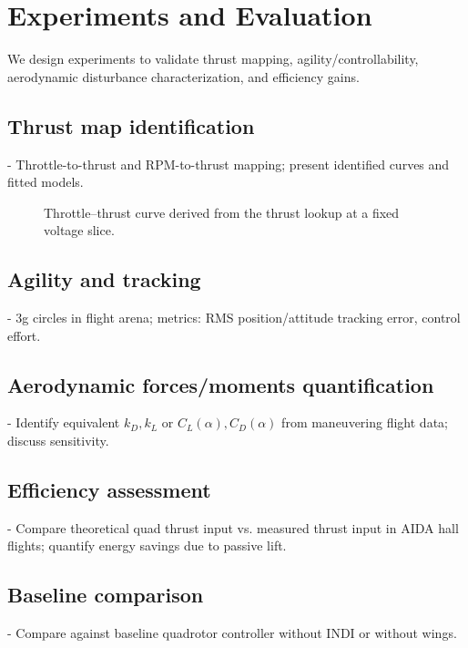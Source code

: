 
\chapter{Experiments and Evaluation}\label{chapter:experiments-evaluation}

We design experiments to validate thrust mapping, agility/controllability, aerodynamic disturbance characterization, and efficiency gains.

\section{Thrust map identification}
- Throttle-to-thrust and RPM-to-thrust mapping; present identified curves and fitted models.

\begin{figure}[htbp]
  \centering
  \caption{Throttle–thrust curve derived from the thrust lookup at a fixed voltage slice.}
\end{figure}

\section{Agility and tracking}
- 3g circles in flight arena; metrics: RMS position/attitude tracking error, control effort.

\section{Aerodynamic forces/moments quantification}
- Identify equivalent $k_D,k_L$ or $C_L(\alpha), C_D(\alpha)$ from maneuvering flight data; discuss sensitivity.

\section{Efficiency assessment}
- Compare theoretical quad thrust input vs. measured thrust input in AIDA hall flights; quantify energy savings due to passive lift.

\section{Baseline comparison}
- Compare against baseline quadrotor controller without INDI or without wings.
